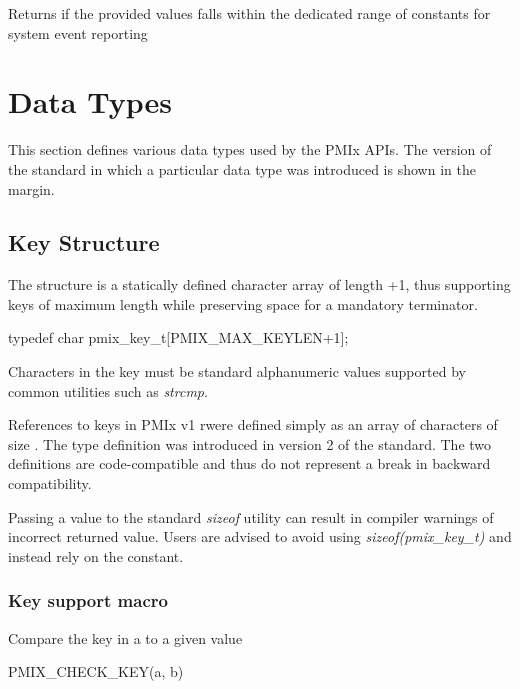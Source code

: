 Returns  if the provided values falls within the dedicated range of constants for system event reporting


\section{Data Types}

This section defines various data types used by the PMIx APIs. The version of the standard in which a particular data type was introduced is shown in the margin.

\subsection{Key Structure}

The  structure is a statically defined character array of length +1, thus supporting keys of maximum length  while preserving space for a mandatory  terminator.

\cspecificstart
\begin{codepar}
typedef char pmix_key_t[PMIX_MAX_KEYLEN+1];
\end{codepar}
\cspecificend

Characters in the key must be standard alphanumeric values supported by common utilities such as \textit{strcmp}.

\adviceuserstart
References to keys in \ac{PMIx} v1 rwere defined simply as an array of characters of size . The  type definition was introduced in version 2 of the standard. The two definitions are code-compatible and thus do not represent a break in backward compatibility.

Passing a  value to the standard \textit{sizeof} utility can result in compiler warnings of incorrect returned value. Users are advised to avoid using \textit{sizeof(pmix_key_t)} and instead rely on the  constant.
\adviceuserend

\subsubsection{Key support macro}

Compare the key in a  to a given value

\cspecificstart
\begin{codepar}
PMIX_CHECK_KEY(a, b)
\end{codepar}
\cspecificend

